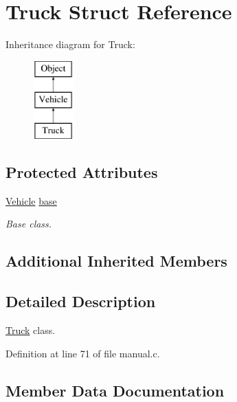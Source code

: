 \hypertarget{struct_truck}{}\section{Truck Struct Reference}
\label{struct_truck}
Inheritance diagram for Truck\+:\begin{figure}[H]
\begin{center}
\leavevmode
\includegraphics[height=3.000000cm]{struct_truck}
\end{center}
\end{figure}
\subsection*{Protected Attributes}
\begin{DoxyCompactItemize}
\item 
\mbox{\hyperlink{struct_vehicle}{Vehicle}} \mbox{\hyperlink{struct_truck_ad0ac321609dda1a6c552488b05ec7ac8}{base}}
\begin{DoxyCompactList}\small\item\em Base class. \end{DoxyCompactList}\end{DoxyCompactItemize}
\subsection*{Additional Inherited Members}


\subsection{Detailed Description}
\mbox{\hyperlink{struct_truck}{Truck}} class. 

Definition at line 71 of file manual.\+c.



\subsection{Member Data Documentation}
\mbox{\label{struct_truck_ad0ac321609dda1a6c552488b05ec7ac8}} 
